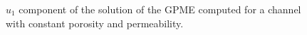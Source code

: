 \documentclass{article}
\begin{document}
\begin{figure}[p]
\centering
{}
\caption{$u_1$ component of the solution of the GPME computed for a channel with constant porosity and permeability.}\label{fig:por}
\end{figure}
\end{document}
